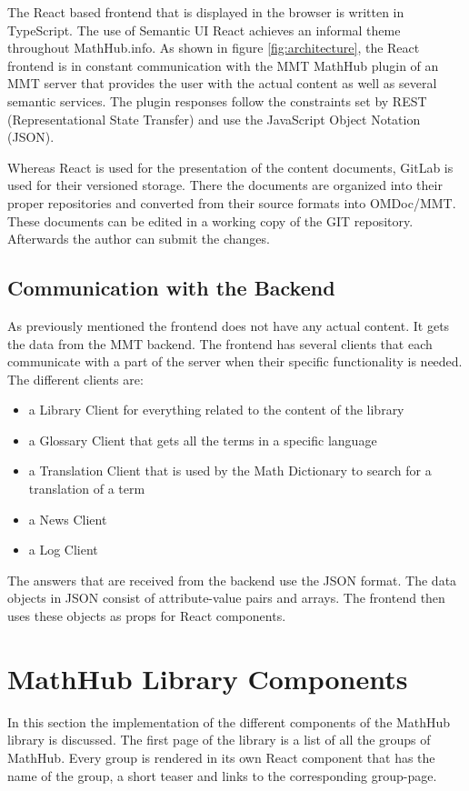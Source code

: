 \documentclass[11pt,a4paper]{article}
\begin{document}
The React based frontend that is displayed in the browser is written in TypeScript.
The use of Semantic UI React achieves an informal theme throughout MathHub.info.
As shown in figure \ref{fig:architecture}, the React frontend is in constant communication with the MMT MathHub plugin of an MMT server that provides the user with the actual content as well as several semantic services.
The plugin responses follow the constraints set by REST (Representational State Transfer) and use the JavaScript Object Notation (JSON).


Whereas React is used for the presentation of the content documents, GitLab is used for their versioned storage.
There the documents are organized into their proper repositories and converted from their source formats into OMDoc/MMT.
These documents can be edited in a working copy of the GIT repository.
Afterwards the author can submit the changes.

\subsection{Communication with the Backend}

As previously mentioned the frontend does not have any actual content.
It gets the data from the MMT backend.
The frontend has several clients that each communicate with a part of the server when their specific functionality is needed.
The different clients are:
\begin{itemize}
\item a Library Client for everything related to the content of the library
\item a Glossary Client that gets all the terms in a specific language
\item a Translation Client that is used by the Math Dictionary to search for a translation of a term 
\item a News Client
\item a Log Client
\end{itemize}

The answers that are received from the backend use the JSON format.
The data objects in JSON consist of attribute-value pairs and arrays.
The frontend then uses these objects as props for React components.


\section{MathHub Library Components} \label{library}
In this section the implementation of the different components of the MathHub library is discussed.
The first page of the library is a list of all the groups of MathHub.
Every group is rendered in its own React component that has the name of the group, a short teaser and links to the corresponding group-page.
\end{document}
